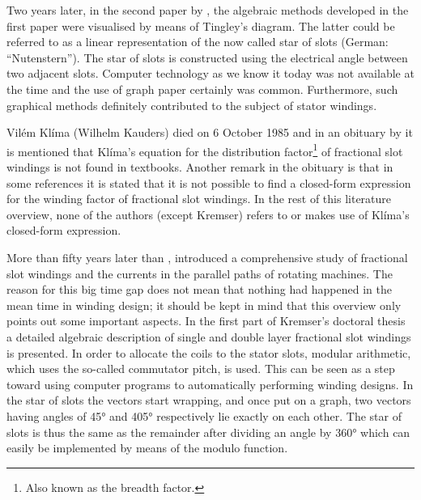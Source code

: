 Two years later, in the second paper by \cite{REF-00837}, the algebraic methods developed in the first paper were visualised by means of Tingley's diagram. The latter could be referred to as a linear representation of the now called star of slots (German: ``Nutenstern''). The star of slots is constructed using the electrical angle between two adjacent slots. Computer technology as we know it today was not available at the time and the use of graph paper certainly was common. Furthermore, such graphical methods definitely contributed to the subject of stator windings.

Vil\'em Kl\'ima (Wilhelm Kauders) died on 6 October 1985 and in an obituary by \cite{REF-01054} it is mentioned that Kl\'ima's equation for the distribution factor\footnote{Also known as the breadth factor.} of fractional slot windings is not found in textbooks. Another remark in the obituary is that in some references it is stated that it is not possible to find a closed-form expression for the winding factor of fractional slot windings. In the rest of this literature overview, none of the authors (except Kremser) refers to or makes use of Kl\'ima's closed-form expression. 

More than fifty years later than \cite{REF-00837}, \cite{REF-00266} introduced a comprehensive study of fractional slot windings and the currents in the parallel paths of rotating machines. The reason for this big time gap does not mean that nothing had happened in the mean  time in winding design; it should be kept in mind that this overview only points out some important aspects. In the first part of Kremser's doctoral thesis a detailed algebraic description of single and double layer fractional slot windings is presented. In order to allocate the coils to the stator slots, modular arithmetic, which uses the so-called commutator pitch, is used. This can be seen as a step toward using computer programs to automatically performing winding designs. In the star of slots the vectors start wrapping, and once put on a graph, two vectors having angles of \ang{45} and \ang{405} respectively lie exactly on each other. The star of slots is thus the same as the remainder after dividing an angle by \ang{360} which can easily be implemented by means of the modulo function.  

